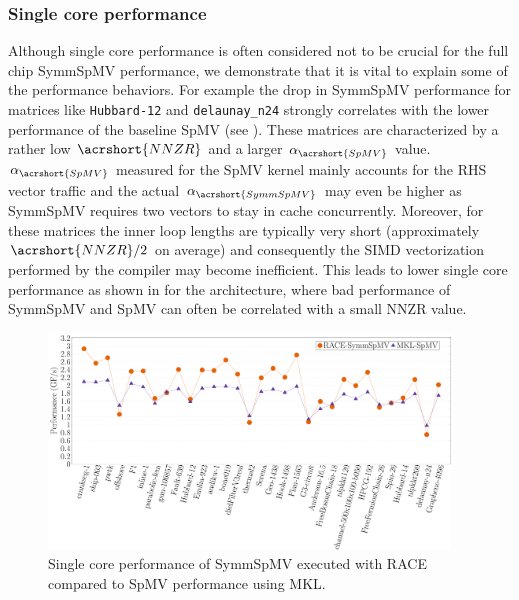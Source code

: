 \subsubsection{Single core performance}
Although single core performance is often considered not to be crucial for 
the full chip \acrshort{SymmSpMV} performance, we demonstrate that it is
vital to explain some of the performance behaviors. For example the drop in 
\acrshort{SymmSpMV} performance
 for matrices like  \texttt{Hubbard-12} and \texttt{delaunay\_n24} strongly correlates with
 the lower performance of the baseline \acrshort{SpMV} (see ).
 These matrices are characterized by a rather low $\acrshort{NNZR}$ and a 
 larger $\alpha_{\acrshort{SpMV}}$ value.    $\alpha_{\acrshort{SpMV}}$ 
 measured for the \acrshort{SpMV}  kernel mainly accounts for the RHS vector traffic 
  and the actual $\alpha_{\acrshort{SymmSpMV}}$ may even be higher as \acrshort{SymmSpMV}
  requires two vectors to stay in cache concurrently. 
 Moreover, for these matrices the inner loop lengths are typically very short (approximately $\acrshort{NNZR}/2$ on average) and consequently the SIMD vectorization performed by the 
 compiler may become inefficient. This leads to lower single core performance
  as shown in  for the \SKX architecture, 
  where bad performance of \acrshort{SymmSpMV}  and \acrshort{SpMV} can often be 
  correlated with a small \acrshort{NNZR} value. 
%
 \begin{figure}[t]
 	\centering
 	\includegraphics[width=0.95\textwidth, height=0.34\textheight]{pics/results/skx/data_symm_spmv_single_core/plot_generator/perf_vs_mtx_RACE_vs_MKL/perf}
 	\caption{Single core performance of \acrshort{SymmSpMV}  
 	executed with \acrshort{RACE} compared to \acrshort{SpMV} performance using \acrshort{MKL}.}
 	\label{fig:SpMV_vs_SymmSpMV_single_core}
 \end{figure}
